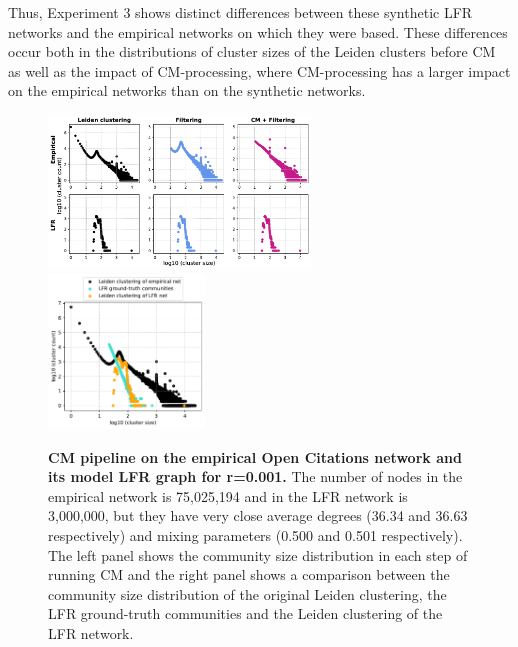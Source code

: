 \documentclass[11pt]{article}   	%
\begin{document}
Thus, Experiment 3 shows distinct differences between these synthetic LFR networks and the empirical networks on which they were based.
These differences occur both in the distributions of cluster sizes of the Leiden clusters before CM as well as the impact of CM-processing, where CM-processing has a larger impact on the empirical networks than on the synthetic networks.






\begin{figure}[h!]
\centering
\includegraphics[width=0.62\textwidth]{figs/oc_cm_steps_lfr001.pdf}
\includegraphics[width=0.37\textwidth]{figs/oc_001_cm_size.pdf}
\caption[CM pipeline on the empirical Open Citations network and its model LFR graph for r=0.001]{\textbf{CM pipeline on the empirical Open Citations network and its model LFR graph for r=0.001.} The number of nodes in the empirical network is 75,025,194 and in the LFR network is 3,000,000, but they have very close average degrees (36.34 and 36.63 respectively) and mixing parameters (0.500 and 0.501 respectively). The left panel shows the community size distribution in each step of running CM and the right panel shows a comparison between the community size distribution of the original Leiden clustering, the LFR ground-truth communities and the Leiden clustering of the LFR network.}
\label{fig:oc-cm-lfr-001}
\end{figure}
\end{document}
